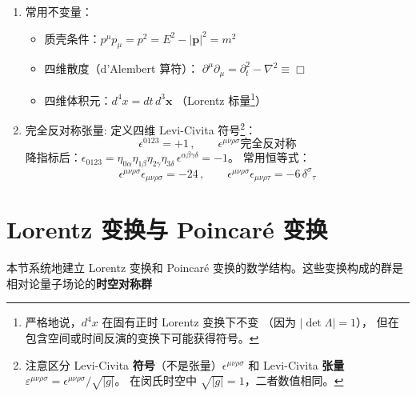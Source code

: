 \begin{enumerate}
          \noindent\textbf{指标升降：} 度规 $\eta_{\mu\nu}$ 及其逆 $\eta^{\mu\nu}$
          （在当前约定下二者数值相同）用于升降指标：
          \begin{equation}
            A_\mu = \eta_{\mu\nu}A^\nu\,,\qquad A^\mu = \eta^{\mu\nu}A_\nu
          \end{equation}
          对于逆变（上指标）四矢量 $A^\mu = (A^0, \mathbf{A})$，
          对应的协变（下指标）四矢量为 $A_\mu = (A^0, -\mathbf{A})$。
    \item 常用不变量：
      \begin{itemize}
    \item 质壳条件：$p^\mu p_\mu = p^2 = E^2 - |\mathbf{p}|^2 = m^2$
    \item 四维散度（d'Alembert 算符）：
          $\partial^\mu\partial_\mu
          = \partial_t^2 - \nabla^2
          \equiv \Box$
    \item 四维体积元：$d^4x = dt\,d^3\mathbf{x}$
          （Lorentz 标量\footnote{
          严格地说，$d^4x$ 在固有正时 Lorentz 变换下不变
          （因为 $|\det\Lambda| = 1$），
          但在包含空间或时间反演的变换下可能获得符号。}）
      \end{itemize}
    \item 完全反对称张量:
    定义四维 Levi-Civita 符号\footnote{
    注意区分 Levi-Civita \textbf{符号}（不是张量）$\epsilon^{\mu\nu\rho\sigma}$
    和 Levi-Civita \textbf{张量}
    $\varepsilon^{\mu\nu\rho\sigma} = \epsilon^{\mu\nu\rho\sigma}/\sqrt{|g|}$。
      在闵氏时空中 $\sqrt{|g|} = 1$，二者数值相同。
    }：
    \begin{equation}
  \epsilon^{0123} = +1\,,\qquad
  \epsilon^{\mu\nu\rho\sigma}\text{完全反对称}
    \end{equation}
    降指标后：$\epsilon_{0123} = \eta_{0\alpha}\eta_{1\beta}\eta_{2\gamma}\eta_{3\delta}
      \,\epsilon^{\alpha\beta\gamma\delta} = -1$。
常用恒等式：
    \begin{equation}
  \epsilon^{\mu\nu\rho\sigma}\epsilon_{\mu\nu\rho\sigma} = -24\,,\qquad
  \epsilon^{\mu\nu\rho\sigma}\epsilon_{\mu\nu\rho\tau} = -6\,\delta^\sigma{}_\tau
    \end{equation}
\end{enumerate}
\newpage
\section{Lorentz 变换与 Poincar\'e 变换}

本节系统地建立 Lorentz 变换和 Poincar\'e 变换的数学结构。这些变换构成的群是
相对论量子场论的\textbf{时空对称群}
